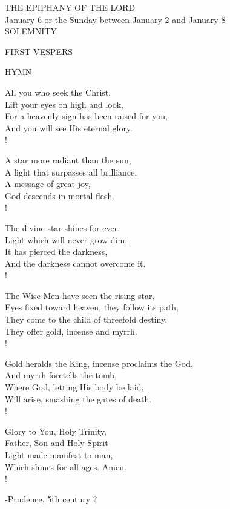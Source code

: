 \begin{center}\normalsize THE EPIPHANY OF THE LORD\\
\footnotesize January 6 or the Sunday between January 2 and January 8\\
\footnotesize SOLEMNITY\\
\end{center}

\begin{flushleft}\normalsize FIRST VESPERS\\\end{flushleft}

\noindent\small{\uppercase{Hymn }}\normalsize\label{epiphany:hymn}
\begin{cverse}
All you who seek the Christ,\\
Lift your eyes on high and look,\\
For a heavenly sign has been raised for you,\\
And you will see His eternal glory.\\!

A star more radiant than the sun,\\
A light that surpasses all brilliance,\\
A message of great joy,\\
God descends in mortal flesh.\\!

The divine star shines for ever.\\
Light which will never grow dim;\\
It has pierced the darkness,\\
And the darkness cannot overcome it.\\!

The Wise Men have seen the rising star,\\
Eyes fixed toward heaven, they follow its path;\\
They come to the child of threefold destiny,\\
They offer gold, incense and myrrh.\\!

Gold heralds the King, incense proclaims the God,\\
And myrrh foretells the tomb,\\
Where God, letting His body be laid,\\
Will arise, smashing the gates of death.\\!

Glory to You, Holy Trinity,\\
Father, Son and Holy Spirit\\
Light made manifest to man,\\
Which shines for all ages. Amen.\\!
\end{cverse}
\begin{flushright}\tiny -Prudence, 5th century ?\end{flushright}

